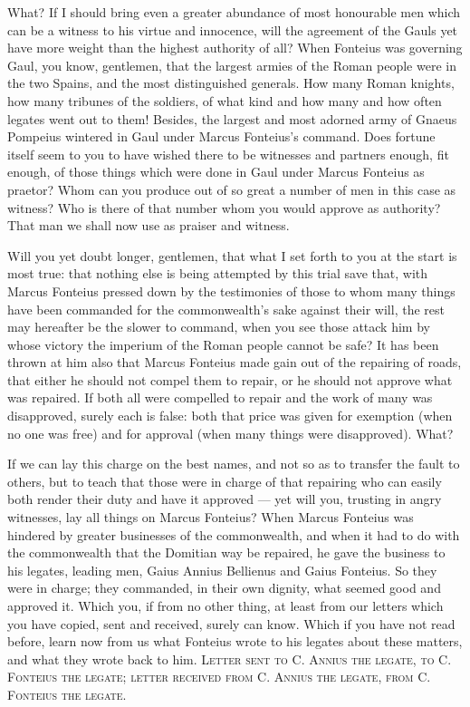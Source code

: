  What? If I should bring even a greater abundance of most honourable men which can be a witness to his virtue and innocence, will the agreement of the Gauls yet have more weight than the highest authority of all? When Fonteius was governing Gaul, you know, gentlemen, that the largest armies of the Roman people were in the two Spains, and the most distinguished generals. How many Roman knights, how many tribunes of the soldiers, of what kind and how many and how often legates went out to them! Besides, the largest and most adorned army of Gnaeus Pompeius wintered in Gaul under Marcus Fonteius's command. Does fortune itself seem to you to have wished there to be witnesses and partners enough, fit enough, of those things which were done in Gaul under Marcus Fonteius as praetor? Whom can you produce out of so great a number of men in this case as witness? Who is there of that number whom you would approve as authority? That man we shall now use as praiser and witness.

 Will you yet doubt longer, gentlemen, that what I set forth to you at the start is most true: that nothing else is being attempted by this trial save that, with Marcus Fonteius pressed down by the testimonies of those to whom many things have been commanded for the commonwealth's sake against their will, the rest may hereafter be the slower to command, when you see those attack him by whose victory the imperium of the Roman people cannot be safe? It has been thrown at him also that Marcus Fonteius made gain out of the repairing of roads, that either he should not compel them to repair, or he should not approve what was repaired. If both all were compelled to repair and the work of many was disapproved, surely each is false: both that price was given for exemption (when no one was free) and for approval (when many things were disapproved). What?

 If we can lay this charge on the best names, and not so as to transfer the fault to others, but to teach that those were in charge of that repairing who can easily both render their duty and have it approved --- yet will you, trusting in angry witnesses, lay all things on Marcus Fonteius? When Marcus Fonteius was hindered by greater businesses of the commonwealth, and when it had to do with the commonwealth that the Domitian way be repaired, he gave the business to his legates, leading men, Gaius Annius Bellienus and Gaius Fonteius. So they were in charge; they commanded, in their own dignity, what seemed good and approved it. Which you, if from no other thing, at least from our letters which you have copied, sent and received, surely can know. Which if you have not read before, learn now from us what Fonteius wrote to his legates about these matters, and what they wrote back to him. \textsc{Letter sent to C. Annius the legate, to C. Fonteius the legate; letter received from C. Annius the legate, from C. Fonteius the legate}.

